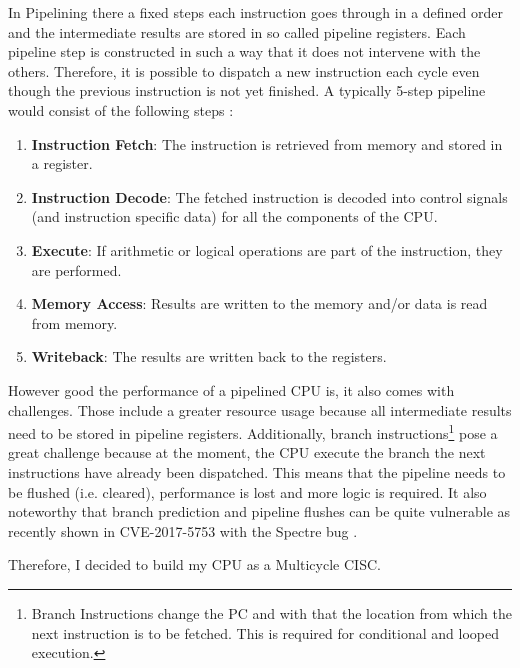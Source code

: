In Pipelining there a fixed steps each instruction goes through in a defined order and the intermediate results are stored in so called pipeline registers.
Each pipeline step is constructed in such a way that it does not intervene with the others.
Therefore, it is possible to dispatch a new instruction each cycle even though the previous instruction is not yet finished.
A typically 5-step pipeline would consist of the following steps \cite{PattersonDavid2016RuRD}:
\begin{enumerate}
  \item \textbf{Instruction Fetch}: The instruction is retrieved from memory and stored in a register.
  \item \textbf{Instruction Decode}: The fetched instruction is decoded into control signals (and instruction specific data) for all the components of the \gls{CPU}.
  \item \textbf{Execute}: If arithmetic or logical operations are part of the instruction, they are performed.
  \item \textbf{Memory Access}: Results are written to the memory and/or data is read from memory.
  \item \textbf{Writeback}: The results are written back to the registers.
\end{enumerate}
However good the performance of a pipelined \gls{CPU} is, it also comes with challenges.
Those include a greater resource usage because all intermediate results need to be stored in pipeline registers.
Additionally, branch instructions\footnote{Branch Instructions change the \gls{PC} and with that the location from which the next instruction is to be fetched. This is required for conditional and looped execution.} pose a great challenge because at the moment, the \gls{CPU} execute the branch the next instructions have already been dispatched.
This means that the pipeline needs to be flushed (i.e. cleared), performance is lost and more logic is required.
It also noteworthy that branch prediction and pipeline flushes can be quite vulnerable as recently shown in CVE-2017-5753 with the Spectre bug \cite{CVE-2017-5753}.

Therefore, I decided to build my \gls{CPU} as a Multicycle \gls{CISC}.

